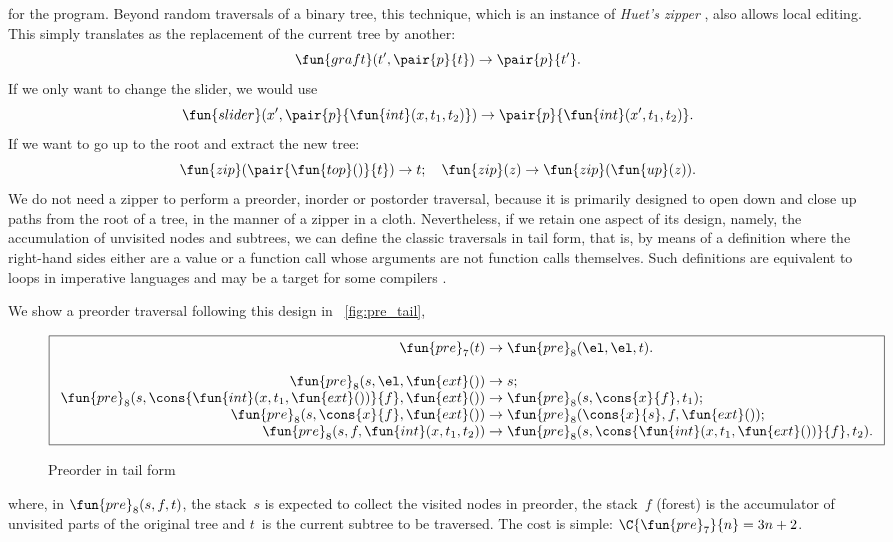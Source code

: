 for the program. Beyond random traversals of a binary tree, this
technique, which is an instance of \emph{Huet's zipper}
\citep{Huet_1997,Huet_2003}, also allows local editing. This simply
translates as the replacement of the current tree by another:
\begin{equation*}
\fun{graft}(t',\pair{p}{t}) \rightarrow \pair{p}{t'}.
\end{equation*}
If we only want to change the slider, we would use
\begin{equation*}
\fun{slider}(x',\pair{p}{\fun{int}(x,t_1,t_2)}) \rightarrow
\pair{p}{\fun{int}(x',t_1,t_2)}.
\end{equation*}
If we want to go up to the root and extract the new tree:
\begin{equation*}
\fun{zip}(\pair{\fun{top}()}{t}) \rightarrow t;\quad
\fun{zip}(z) \rightarrow \fun{zip}(\fun{up}(z)).
\end{equation*}
We do not need a zipper to perform a
preorder, inorder or postorder traversal, because it is primarily
designed to open down and close up paths from the root of a tree, in
the manner of a zipper in a
cloth. Nevertheless, if we retain one aspect of its design, namely,
the accumulation of unvisited nodes and subtrees, we can define the
classic traversals in tail form,
that is, by means of a definition where the right\hyp{}hand sides
either are a value or a function call whose arguments are not function
calls themselves. Such definitions are equivalent to loops in
imperative languages and may be a target for some compilers
\citep{Appel_1992}.

We show a preorder traversal following this design in
\fig~\vref{fig:pre_tail},
\begin{figure}[t]
\begin{equation*}
\boxed{
\begin{array}{r@{\;}c@{\;}l}
\fun{pre}_7(t) & \rightarrow & \fun{pre}_8(\el,\el,t).\\
\\
\fun{pre}_8(s,\el,\fun{ext}()) & \rightarrow & s;\\
\fun{pre}_8(s,\cons{\fun{int}(x,t_1,\fun{ext}())}{f},\fun{ext}()) &
\rightarrow & \fun{pre}_8(s,\cons{x}{f},t_1);\\
\fun{pre}_8(s,\cons{x}{f},\fun{ext}()) & \rightarrow &
\fun{pre}_8(\cons{x}{s},f,\fun{ext}());\\
\fun{pre}_8(s,f,\fun{int}(x,t_1,t_2)) & \rightarrow &
\fun{pre}_8(s,\cons{\fun{int}(x,t_1,\fun{ext}())}{f},t_2).
\end{array}}
\end{equation*}
\caption{Preorder in tail form}
\label{fig:pre_tail}
\end{figure}
where, in \(\fun{pre}_8(s,f,t)\), the stack~\(s\) is expected to
collect the visited nodes in preorder, the stack~\(f\) (forest) is the
accumulator of unvisited parts of the original tree and \(t\)~is the
current subtree to be traversed. The cost is simple:
\(\C{\fun{pre}_7}{n} = 3n + 2\).


